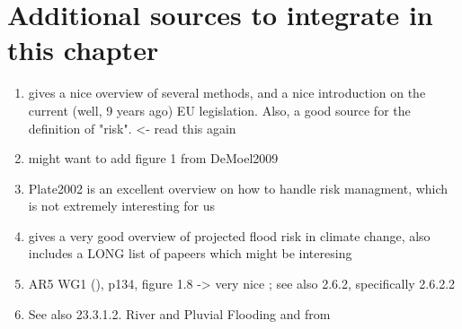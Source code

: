 \section{Additional sources to integrate in this chapter}
\begin{enumerate}
    \item \cite{DeMoel2009} gives a nice overview of several methods, and a nice introduction on the current (well, 9 years ago) EU legislation. Also, a good source for the definition of "risk". <- read this again
    \item might want to add figure 1 from DeMoel2009
    \item Plate2002 is an excellent overview on how to handle risk managment, which is not extremely interesting for us
    \item \cite{Arnell2016} gives a very good overview of projected flood risk in climate change, also includes a LONG list of papeers which might be interesing
    \item AR5 WG1 (\cite{IPCC2013}), p134, figure 1.8 -> very nice ; see also 2.6.2, specifically 2.6.2.2
    \item See also 23.3.1.2. River and Pluvial Flooding and from \cite{Aalst2014}
\end{enumerate}